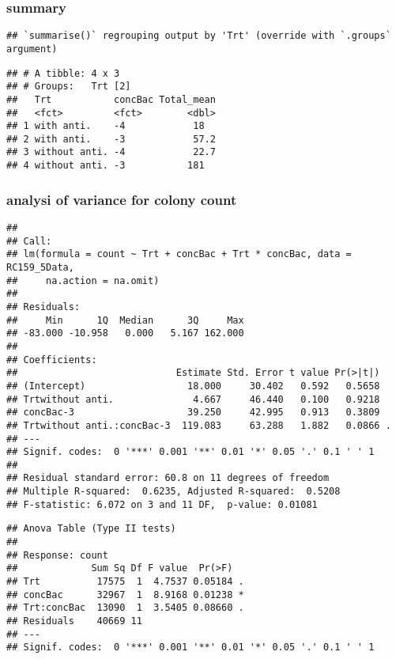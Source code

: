 \documentclass[
]{article}
\begin{document}
\hypertarget{summary-1}{%
\subsubsection{summary}\label{summary-1}}

\begin{verbatim}
## `summarise()` regrouping output by 'Trt' (override with `.groups` argument)
\end{verbatim}

\begin{verbatim}
## # A tibble: 4 x 3
## # Groups:   Trt [2]
##   Trt           concBac Total_mean
##   <fct>         <fct>        <dbl>
## 1 with anti.    -4            18  
## 2 with anti.    -3            57.2
## 3 without anti. -4            22.7
## 4 without anti. -3           181
\end{verbatim}

\hypertarget{analysi-of-variance-for-colony-count}{%
\subsubsection{analysi of variance for colony
count}\label{analysi-of-variance-for-colony-count}}

\begin{verbatim}
## 
## Call:
## lm(formula = count ~ Trt + concBac + Trt * concBac, data = RC159_5Data, 
##     na.action = na.omit)
## 
## Residuals:
##     Min      1Q  Median      3Q     Max 
## -83.000 -10.958   0.000   5.167 162.000 
## 
## Coefficients:
##                            Estimate Std. Error t value Pr(>|t|)  
## (Intercept)                  18.000     30.402   0.592   0.5658  
## Trtwithout anti.              4.667     46.440   0.100   0.9218  
## concBac-3                    39.250     42.995   0.913   0.3809  
## Trtwithout anti.:concBac-3  119.083     63.288   1.882   0.0866 .
## ---
## Signif. codes:  0 '***' 0.001 '**' 0.01 '*' 0.05 '.' 0.1 ' ' 1
## 
## Residual standard error: 60.8 on 11 degrees of freedom
## Multiple R-squared:  0.6235, Adjusted R-squared:  0.5208 
## F-statistic: 6.072 on 3 and 11 DF,  p-value: 0.01081
\end{verbatim}

\begin{verbatim}
## Anova Table (Type II tests)
## 
## Response: count
##             Sum Sq Df F value  Pr(>F)  
## Trt          17575  1  4.7537 0.05184 .
## concBac      32967  1  8.9168 0.01238 *
## Trt:concBac  13090  1  3.5405 0.08660 .
## Residuals    40669 11                  
## ---
## Signif. codes:  0 '***' 0.001 '**' 0.01 '*' 0.05 '.' 0.1 ' ' 1
\end{verbatim}
\end{document}
